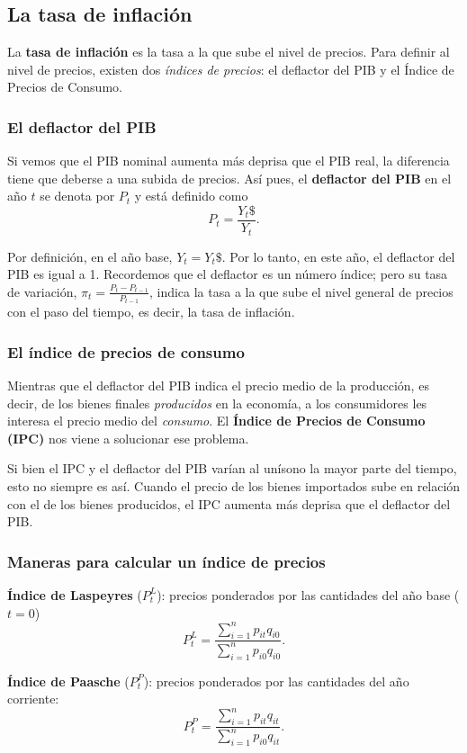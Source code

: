 \documentclass[10pt]{article}
\begin{document}
\begin{multicols*}{2}
\subsection{La tasa de inflación}
La \textbf{tasa de inflación} es la tasa a la que sube el nivel de precios. Para definir al nivel de precios, existen dos \textit{índices de precios}: el deflactor del PIB y el Índice de Precios de Consumo.

\subsubsection{El deflactor del PIB}
Si vemos que el PIB nominal aumenta más deprisa que el PIB real, la diferencia tiene que deberse a una subida de precios. Así pues, el \textbf{deflactor del PIB} en el año $t$ se denota por $P_t$ y está definido como
\[ P_t = \frac{Y_t \$}{Y_t}. \]

Por definición, en el año base, $Y_t = Y_t \$$. Por lo tanto, en este año, el deflactor del PIB es igual a 1. Recordemos que el deflactor es un número índice; pero su tasa de variación, $\pi_t = \frac{P_t - P_{t-1}}{P_{t-1}}$, indica la tasa a la que sube el nivel general de precios con el paso del tiempo, es decir, la tasa de inflación.

\subsubsection{El índice de precios de consumo}
Mientras que el deflactor del PIB indica el precio medio de la producción, es decir, de los bienes finales \textit{producidos} en la economía, a los consumidores les interesa el precio medio del \textit{consumo}. El \textbf{Índice de Precios de Consumo (IPC)} nos viene a solucionar ese problema.

Si bien el IPC y el deflactor del PIB varían al unísono la mayor parte del tiempo, esto no siempre es así. Cuando el precio de los bienes importados sube en relación con el de los bienes producidos, el IPC aumenta más deprisa que el deflactor del PIB.

\subsubsection{Maneras para calcular un índice de precios}
\textbf{Índice de Laspeyres} ($P_t^L$): precios ponderados por las cantidades del año base ($t=0$)
\[ P_t^L = \frac{ \sum_{i=1}^n p_{it} q_{i0} }{\sum_{i=1}^n p_{i0} q_{i0}}. \]

\textbf{Índice de Paasche} ($P_t^P$): precios ponderados por las cantidades del año corriente:
\[ P_t^P = \frac{ \sum_{i=1}^n p_{it} q_{it} }{\sum_{i=1}^n p_{i0} q_{it}}. \]



\end{multicols*}
\end{document}
